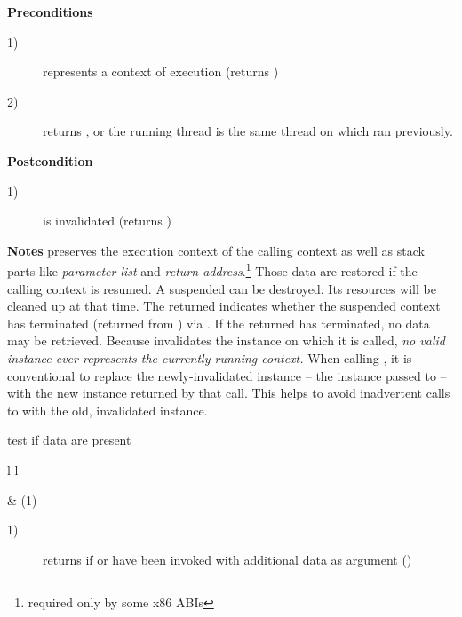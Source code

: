 {\bfseries Preconditions}
\begin{description}
    \item[1)]  represents a context of execution (\opbool returns
               )
    \item[2)]  returns , or the running thread is
              the same thread on which  ran previously.
\end{description}

{\bfseries Postcondition}
\begin{description}
    \item[1)]  is invalidated (\opbool returns )
\end{description}

{\bfseries Notes}
\newline
\resume preserves the execution context of the calling context as well as stack
parts like \emph{parameter list} and \emph{return address}.\footnote{required
only by some x86 ABIs} Those data are restored if the calling context is
resumed.
\newline
A suspended  can be destroyed. Its resources will be cleaned
up at that time.
\newline
The returned  indicates whether the suspended context
has terminated (returned from \entryfn) via \opbool. If the returned
 has terminated, no data may be retrieved.
\newline
Because \resume invalidates the instance on which it is called, \emph{no valid
\cont instance ever represents the currently-running context.}
\newline
When calling \resume, it is conventional to replace the newly-invalidated
instance -- the instance passed to \resume -- with the new instance
returned by that \resume call. This helps to avoid inadvertent calls to \resume
with the old, invalidated instance.



test if data are present\\

\begin{tabular}{ l l }
    \midrule

     & (1)\\

    \midrule
\end{tabular}

\begin{description}
    \item[1)] returns  if \call or \resume have been invoked with
              additional data as argument ()
\end{description}


